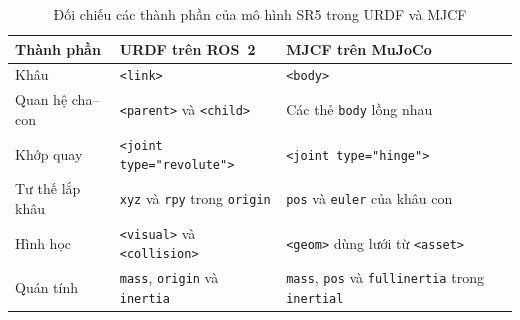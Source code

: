 \begin{table}[H]
  \centering
  \caption{Đối chiếu các thành phần của mô hình SR5 trong URDF và MJCF}
  \label{tab:sr5-urdf-mjcf}
  \renewcommand{\arraystretch}{1.13}
  \begin{tabular}{@{}p{.21\linewidth}p{.34\linewidth}p{.37\linewidth}@{}}
    \toprule
    Thành phần & URDF trên ROS~2 & MJCF trên MuJoCo \\
    \midrule
    Khâu & \verb|<link>| & \verb|<body>| \\
    Quan hệ cha--con & \verb|<parent>| và \verb|<child>| & Các thẻ \texttt{body} lồng nhau \\
    Khớp quay & \verb|<joint type="revolute">| & \verb|<joint type="hinge">| \\
    Tư thế lắp khâu & \texttt{xyz} và \texttt{rpy} trong \texttt{origin} & \texttt{pos} và \texttt{euler} của khâu con \\
    Hình học & \verb|<visual>| và \verb|<collision>| & \verb|<geom>| dùng lưới từ \verb|<asset>| \\
    Quán tính & \texttt{mass}, \texttt{origin} và \texttt{inertia} & \texttt{mass}, \texttt{pos} và \texttt{fullinertia} trong \texttt{inertial} \\
    \bottomrule
  \end{tabular}
\end{table}


